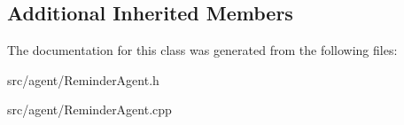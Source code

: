 \subsection*{Additional Inherited Members}


The documentation for this class was generated from the following files\+:\begin{DoxyCompactItemize}
\item 
src/agent/Reminder\+Agent.\+h\item 
src/agent/Reminder\+Agent.\+cpp\end{DoxyCompactItemize}
